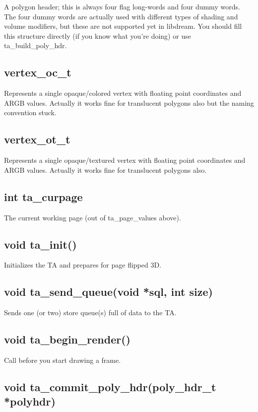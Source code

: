 \documentclass[english]{report}
\begin{document}
A polygon header; this is always four flag long-words and four dummy
words. The four dummy words are actually used with different types
of shading and volume modifiers, but these are not supported yet in
libdream. You should fill this structure directly (if you know what
you're doing) or use ta\_build\_poly\_hdr.


\subsection{vertex\_oc\_t}

Represents a single opaque/colored vertex with floating point coordinates
and ARGB values. Actually it works fine for translucent polygons also
but the naming convention stuck.


\subsection{vertex\_ot\_t}

Represents a single opaque/textured vertex with floating point coordinates
and ARGB values. Actually it works fine for translucent polygons also.


\subsection{int ta\_curpage}

The current working page (out of ta\_page\_values above).


\subsection{void ta\_init()}

Initializes the TA and prepares for page flipped 3D.


\subsection{void ta\_send\_queue(void *sql, int size)}

Sends one (or two) store queue(s) full of data to the TA.


\subsection{void ta\_begin\_render()}

Call before you start drawing a frame.


\subsection{void ta\_commit\_poly\_hdr(poly\_hdr\_t *polyhdr)}
\end{document}
